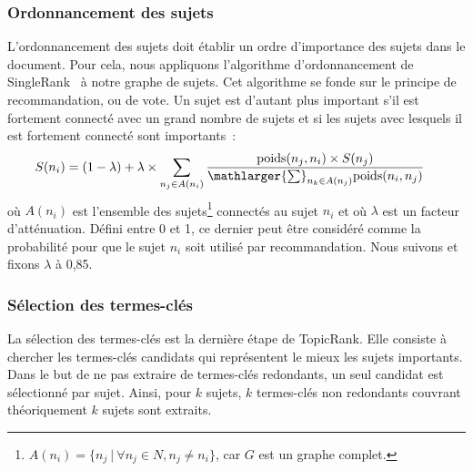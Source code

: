       \subsubsection{Ordonnancement des sujets}
      \label{subsubsec:main:domain_independent_keyphrase_extraction-unsupervised_automatic_keyphrase_extraction-topicrank-topic_ranking}
        L'ordonnancement des sujets doit établir un ordre d'importance des
        sujets dans le document.
        Pour cela, nous appliquons l'algorithme d'ordonnancement de
        SingleRank~\cite{wan2008expandrank} à notre graphe
        de sujets. Cet algorithme se fonde sur le principe de recommandation,
        ou de vote. Un sujet est d'autant plus important s'il est
        fortement connecté avec un grand nombre de sujets et si les sujets avec
        lesquels il est fortement connecté sont importants~:
        \begin{align}
          S(n_i) &= (1 - \lambda) + \lambda \times \sum_{n_j \in A(n_i)} \frac{\text{poids}(n_j, n_i) \times S(n_j)}{\mathlarger{\sum}_{n_k \in A(n_j)} \text{poids}(n_i, n_j)}
        \end{align}
        où $A(n_i)$ est l'ensemble des sujets\footnote{$A(n_i) = \{n_j\ |\
        \forall{n_j \in N}, n_j \neq n_i\}$, car $G$ est un graphe complet.}
        connectés au sujet $n_i$ et où $\lambda$ est un facteur d'atténuation.
        Défini entre 0 et 1, ce dernier peut être considéré comme la probabilité
        pour que le sujet $n_i$ soit utilisé par recommandation. Nous suivons
        \newcite{brin1998pagerank} et fixons $\lambda$ à 0,85.

      \subsubsection{Sélection des termes-clés}
      \label{subsubsec:main:domain_independent_keyphrase_extraction-unsupervised_automatic_keyphrase_extraction-topicrank-keyphrase_selection}
        La sélection des termes-clés est la dernière étape de TopicRank. Elle
        consiste à chercher les termes-clés candidats qui représentent le mieux
        les sujets importants. Dans le but de ne pas extraire de termes-clés
        redondants, un seul candidat est sélectionné par sujet.
        Ainsi, pour $k$ sujets, $k$ termes-clés non redondants couvrant
        théoriquement $k$ sujets sont extraits.


